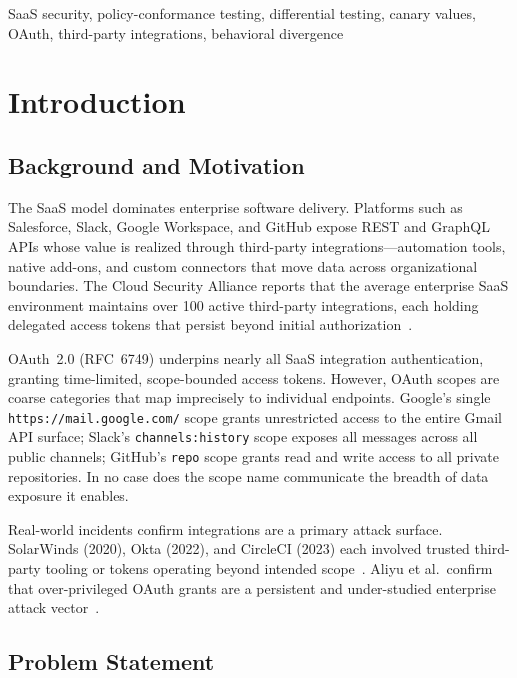 \documentclass[conference]{IEEEtran}
\begin{document}
\begin{IEEEkeywords}
SaaS security, policy-conformance testing, differential testing, canary
values, OAuth, third-party integrations, behavioral divergence
\end{IEEEkeywords}

\section{Introduction}

\subsection{Background and Motivation}

The SaaS model dominates enterprise software delivery. Platforms such
as Salesforce, Slack, Google Workspace, and GitHub expose REST and
GraphQL APIs whose value is realized through third-party
integrations---automation tools, native add-ons, and custom connectors
that move data across organizational boundaries. The Cloud Security
Alliance reports that the average enterprise SaaS environment
maintains over 100 active third-party integrations, each holding
delegated access tokens that persist beyond initial
authorization~\cite{csa2023}.

OAuth~2.0 (RFC~6749) underpins nearly all SaaS integration
authentication, granting time-limited, scope-bounded access tokens.
However, OAuth scopes are coarse categories that map imprecisely to
individual endpoints. Google's single
\texttt{https://mail.google.com/} scope grants unrestricted access to
the entire Gmail API surface; Slack's \texttt{channels:history} scope
exposes all messages across all public channels; GitHub's \texttt{repo}
scope grants read and write access to all private repositories.
In no case does the scope name communicate the breadth of data exposure
it enables.

Real-world incidents confirm integrations are a primary attack surface.
SolarWinds (2020), Okta (2022), and CircleCI (2023) each involved
trusted third-party tooling or tokens operating beyond intended
scope~\cite{solarwinds2020,okta2022,circleci2023}. Aliyu et al.\
confirm that over-privileged OAuth grants are a persistent and
under-studied enterprise attack vector~\cite{aliyu2023}.

\subsection{Problem Statement}
\end{document}
